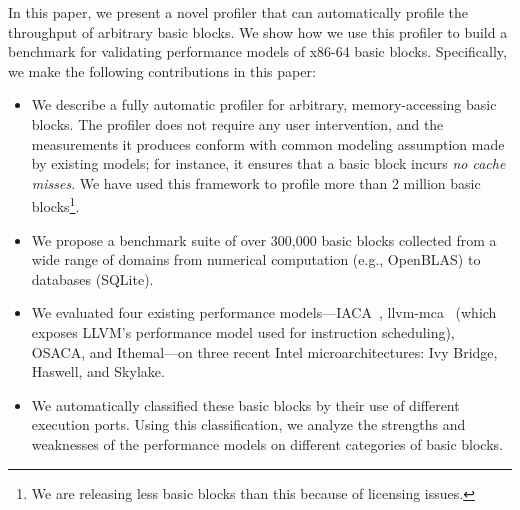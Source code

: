 In this paper, we present a novel profiler that can automatically
profile the throughput of arbitrary basic blocks.
We show how we use this profiler to build a benchmark for validating
performance models of x86-64 basic blocks.
Specifically, we make the following contributions in this paper:
\begin{itemize}
    \item We describe a fully automatic profiler
    for arbitrary, memory-accessing basic blocks.
    The profiler does not require any user intervention, 
    and the measurements it produces conform with common
    modeling assumption made by existing models;
    for instance, it ensures that a basic block incurs
    \textit{no cache misses}.
    We have used this framework to profile more than 2 million basic blocks\footnote{
    We are releasing less basic blocks than this because of licensing issues.
    }.
    
    \item We propose a benchmark suite of over 300,000 basic blocks collected from a wide range of domains from numerical computation (e.g., OpenBLAS) to databases (SQLite).
    
    \item We evaluated four existing performance models---IACA~\cite{iaca}, llvm-mca~\cite{llvm-mca} (which exposes LLVM’s performance model used for instruction scheduling), OSACA\cite{osaca}, and Ithemal\cite{ithemal}---on three recent Intel microarchitectures:
    Ivy Bridge, Haswell, and Skylake.

    \item We automatically classified these basic blocks
    by their use of different execution ports.
    Using this classification,
    we analyze the strengths and weaknesses of 
    the performance models on different categories of basic blocks.
    
\end{itemize}